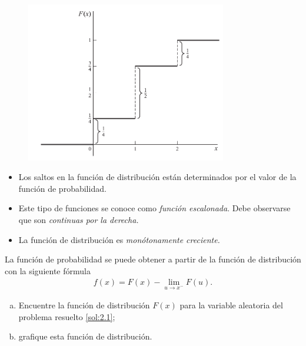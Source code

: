 	\begin{figure}
	\centering
	\includegraphics[height=7cm,keepaspectratio=true]{./pe/pands0201.png}
	\label{fig:0201}
\end{figure}



	\begin{rem}
		\begin{itemize}
			\item Los saltos en la función de distribución están determinados por el valor de la función de probabilidad. 
			\item Este tipo de funciones se conoce como \emph{función escalonada}.  Debe observarse que son \emph{continuas por la derecha.}
			\item La función de distribución es \emph{monótonamente creciente.}
		\end{itemize}

	\end{rem}



	La función de probabilidad se puede obtener a partir de la función de distribución con la siguiente fórmula
	\begin{align}
		\label{2.6}
		f(x)=F(x)-\lim_{u \to x^{-}}F(u).
	\end{align}



 \begin{ejemplo}
  \label{sol:2.3}
  \begin{enumerate}[(a)]
   \item Encuentre la función de distribución $F(x)$ para la variable aleatoria del problema resuelto \ref{sol:2.1};
   \item grafique esta función de distribución.
  \end{enumerate}

 \end{ejemplo}



